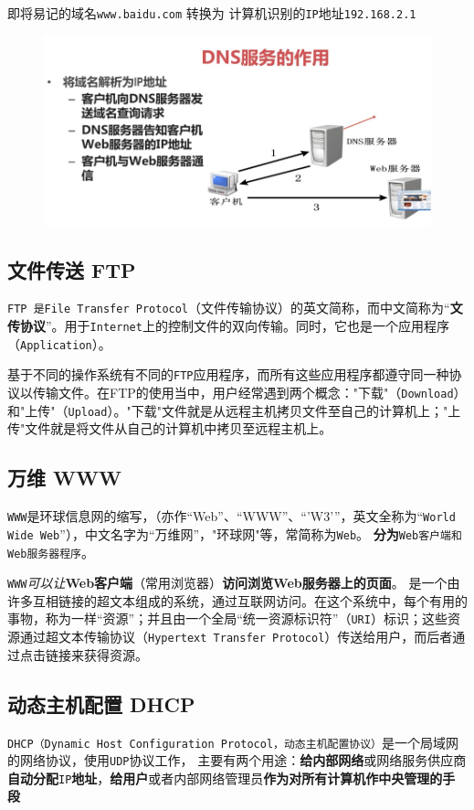 \documentclass[UTF8,a4paper,8pt]{ctexbook}
\begin{document}
			即将易记的域名\verb|www.baidu.com| 转换为 计算机识别的\verb|IP|地址\verb|192.168.2.1|
			\begin{figure}[h]
				\centering
				\includegraphics[scale=0.5]{DNS.png}
			\end{figure}
			
		\subsection{文件传送 FTP}
			\verb|FTP 是File Transfer Protocol|（文件传输协议）的英文简称，而中文简称为“\textbf{文传协议}”。用于\verb|Internet|上的控制文件的双向传输。同时，它也是一个应用程序（\verb|Application|）。
			
			基于不同的操作系统有不同的\verb|FTP|应用程序，而所有这些应用程序都遵守同一种协议以传输文件。在FTP的使用当中，用户经常遇到两个概念："下载"（\verb|Download|）和"上传"（\verb|Upload|）。"下载"文件就是从远程主机拷贝文件至自己的计算机上；"上传"文件就是将文件从自己的计算机中拷贝至远程主机上。
			
		\subsection{万维 WWW}
			\verb|WWW|是环球信息网的缩写，（亦作“Web”、“WWW”、“'W3'”，英文全称为“\verb|World Wide Web|”），中文名字为“万维网”，"环球网"等，常简称为\verb|Web|。 \textbf{分为}\verb|Web客户端和Web服务器程序|。
			
			 \verb|WWW|\textit{可以让}\textbf{Web客户端}（常用浏览器）\textbf{访问浏览Web服务器上的页面}。 是一个由许多互相链接的超文本组成的系统，通过互联网访问。在这个系统中，每个有用的事物，称为一样“资源”；并且由一个全局“统一资源标识符”（\verb|URI|）标识；这些资源通过超文本传输协议（\verb|Hypertext Transfer Protocol|）传送给用户，而后者通过点击链接来获得资源。
		
		\subsection{动态主机配置 DHCP}
			\verb|DHCP（Dynamic Host Configuration Protocol，动态主机配置协议）|是一个局域网的网络协议，使用\verb|UDP|协议工作， 主要有两个用途：\textbf{给内部网络}或网络服务供应商\textbf{自动分配}\verb|IP|\textbf{地址}，\textbf{给用户}或者内部网络管理员\textbf{作为对所有计算机作中央管理的手段}
		
\end{document}
